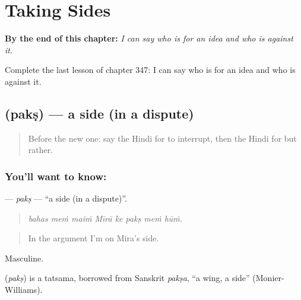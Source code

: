 
\chapter{Taking Sides}
\label{ch:hi-taking-sides}

\begin{chapteropening}
\textbf{By the end of this chapter:} \emph{I can say who is for an idea and who is against it.}

Complete the last lesson of chapter 347: I can say who is for an idea and who is against it.
\end{chapteropening}

\section[\texorpdfstring{\hi{पक्ष} (pakṣ)}{पक्ष (pakṣ)}]{ (pakṣ) — a side (in a dispute)}

\label{lesson:HI-C347-paks}



\begin{quote}
Before the new one: say the Hindi for to interrupt, then the Hindi for but rather.
\end{quote}

\subsection*{You'll want to know: }
\textbf{} — \emph{pakṣ} — \textquotedblleft{}a side (in a dispute)\textquotedblright{}.

\begin{quote}
       
\end{quote}

\begin{quote}
\emph{bahas meṁ maiṁ Mīrā ke pakṣ meṁ hūṁ.}
\end{quote}

\begin{quote}
In the argument I'm on Mira's side.
\end{quote}

Masculine.

\begin{cousinweb}
\textbf{} (\emph{pakṣ}) is a tatsama, borrowed from Sanskrit \emph{pakṣa}, \textquotedblleft{}a wing, a side\textquotedblright{} (Monier-Williams).
\end{cousinweb}

